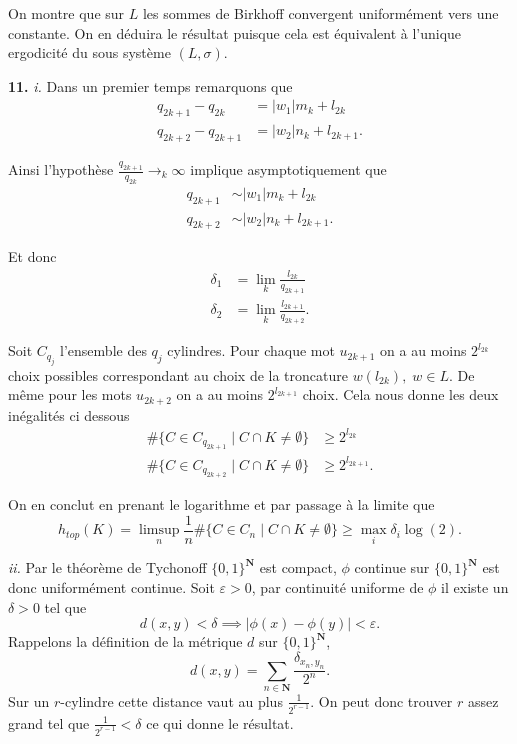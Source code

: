 \documentclass[12pt]{article}
\newcommand{\N}{\mathbf{N}}
\begin{document}
On montre que sur $L$ les sommes de Birkhoff convergent uniformément vers une constante. On en déduira le résultat puisque cela est équivalent à l'unique ergodicité du sous système $(L, \sigma)$.
\medskip

\textbf{11.} \textit{i.} Dans un premier temps remarquons que
\begin{align*}
        q_{2k+1}-q_{2k} &= |w_{1}|m_{k}+l_{2k} \\
        q_{2k+2}-q_{2k+1} &= |w_{2}|n_{k}+l_{2k+1}
.\end{align*}

Ainsi l'hypothèse $\frac{q_{2k+1}}{q_{2k}} \to_{k} \infty$ implique asymptotiquement que
\begin{align*}
        q_{2k+1} &\sim |w_{1}|m_{k}+l_{2k} \\
        q_{2k+2} &\sim |w_{2}|n_{k}+l_{2k+1}
.\end{align*}

Et donc
\begin{align*}
        \delta_{1} &= \lim_{k} \frac{l_{2k}}{q_{2k+1}} \\
        \delta_{2} &= \lim_{k} \frac{l_{2k+1}}{q_{2k+2}}
.\end{align*}

Soit $C_{q_{j}}$ l'ensemble des $q_{j}$ cylindres. Pour chaque mot $u_{2k+1}$ on a au moins $2^{l_{2k}}$ choix possibles correspondant au choix de la troncature $w(l_{2k}), \; w \in L$. De même pour les mots $u_{2k+2}$ on a au moins $2^{l_{2k+1}}$ choix. Cela nous donne les deux inégalités ci dessous
\begin{align*}
        \#\{C \in C_{q_{2k+1}} \;|\; C \cap K \neq \emptyset\} &\ge 2^{l_{2k}} \\
        \#\{C \in C_{q_{2k+2}} \;|\; C \cap K \neq \emptyset\} &\ge 2^{l_{2k+1}}
.\end{align*}

On en conclut en prenant le logarithme et par passage à la limite que \[
        h_{top}(K) = \limsup_{n}\frac{1}{n}\#\{C\in C_{n} \;|\; C \cap K \neq \emptyset\} \ge \max_{i}\delta_{i}\log(2)
.\] 

\medskip

\textit{ii.} Par le théorème de Tychonoff $\{0,1\}^{\N}$ est compact, $\phi$ continue sur $\{0,1\}^{\N}$ est donc uniformément continue. Soit $\varepsilon > 0$, par continuité uniforme de $\phi$ il existe un $\delta > 0$ tel que  \[
        d(x,y) < \delta \implies |\phi(x)-\phi(y)| < \varepsilon
.\]  Rappelons la définition de la métrique $d$ sur $\{0,1\}^{\N}$, \[
d(x,y) = \sum_{n\in\N} \frac{\delta_{x_{n},y_{n}}}{2^{n}}
.\] Sur un $r$-cylindre cette distance vaut au plus $\frac{1}{2^{r-1}}$. On peut donc trouver $r$ assez grand tel que $\frac{1}{2^{r-1}} < \delta$ ce qui donne le résultat.
\end{document}
